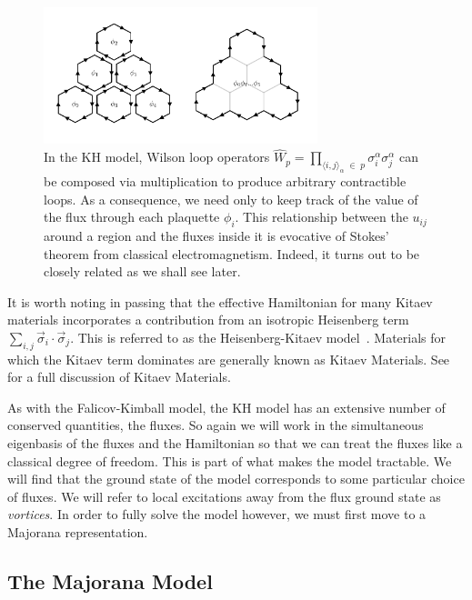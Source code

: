 \hypertarget{fig:stokes_theorem}{%
\begin{figure}
\centering
\includegraphics[width=0.71\textwidth,height=\textheight]{figure_code/amk_chapter/stokes_theorem/stokes_theorem}
\caption[{We can construct arbitrary loops from plaquette fluxes.}]{In the KH model, Wilson loop operators \(\hat{W}_p = \prod_{\langle i,j\rangle_\alpha\; \in\; p} \sigma_i^{\alpha}\sigma_j^{\alpha}\) can be composed via multiplication to produce arbitrary contractible loops. As a consequence, we need only to keep track of the value of the flux through each plaquette \(\phi_i\). This relationship between the \(u_{ij}\) around a region and the fluxes inside it is evocative of Stokes' theorem from classical electromagnetism. Indeed, it turns out to be closely related as we shall see later.}
\label{fig:stokes_theorem}
\end{figure}
}

It is worth noting in passing that the effective Hamiltonian for many Kitaev materials incorporates a contribution from an isotropic Heisenberg term \(\sum_{i,j} \vec{\sigma}_i\cdot\vec{\sigma}_j\). This is referred to as the Heisenberg-Kitaev model~\autocite{Chaloupka2010}. Materials for which the Kitaev term dominates are generally known as Kitaev Materials. See~\autocite{TrebstPhysRep2022} for a full discussion of Kitaev Materials.

As with the Falicov-Kimball model, the KH model has an extensive number of conserved quantities, the fluxes. So again we will work in the simultaneous eigenbasis of the fluxes and the Hamiltonian so that we can treat the fluxes like a classical degree of freedom. This is part of what makes the model tractable. We will find that the ground state of the model corresponds to some particular choice of fluxes. We will refer to local excitations away from the flux ground state as \emph{vortices}. In order to fully solve the model however, we must first move to a Majorana representation.

\hypertarget{the-majorana-model}{%
\subsection{The Majorana Model}\label{the-majorana-model}}

